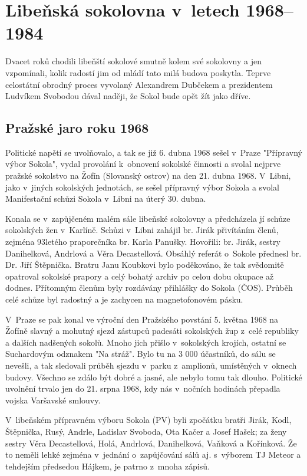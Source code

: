 \documentclass[a5paper, 11pt, twoside]{article}
\begin{document}
\section{Libeňská sokolovna v~letech
1968--1984}

Dvacet roků chodili libeňští sokolové smutně kolem své sokolovny a jen
vzpomínali, kolik radostí jim od mládí tato milá budova poskytla. Teprve
celostátní obrodný proces vyvolaný Alexandrem Dubčekem a prezidentem
Ludvíkem Svobodou dával naději, že Sokol bude opět žít jako dříve.

\subsection{Pražské jaro roku 1968}

Politické napětí se uvolňovalo, a tak se již 6. dubna 1968 sešel v~Praze
"Přípravný výbor Sokola", vydal provolání k~obnovení sokolské činnosti
a svolal nejprve pražské sokolstvo na Žofín (Slovanský ostrov) na den
21. dubna 1968. V~Libni, jako v~jiných sokolských jednotách, se sešel
přípravný výbor Sokola a svolal Manifestační schůzi Sokola v~Libni na
úterý 30. dubna.

Konala se v~zapůjčeném malém sále libeňské sokolovny a předcházela jí
schůze sokolských žen v~Karlíně. Schůzi v~Libni zahájil br. Jirák
přivítáním členů, zejména 93letého praporečníka br. Karla Panušky.
Hovořili: br. Jirák, sestry Danihelková, Andrlová a Věra Decastellová.
Obsáhlý referát o~Sokole přednesl br. Dr. Jiří Štěpnička. Bratru Janu
Koubkovi bylo poděkováno, že tak svědomitě opatroval sokolské prapory a
celý bohatý archiv po celou dobu okupace až dodnes. Přítomným členům
byly rozdávány přihlášky do Sokola (ČOS). Průběh celé schůze byl
radostný a je zachycen na magnetofonovém pásku.

V~Praze se pak konal ve výroční den Pražského povstání 5. května 1968 na
Žofíně slavný a mohutný sjezd zástupců padesáti sokolských žup z~celé
republiky a dalších nadšených sokolů. Mnoho jich přišlo v~sokolských
krojích, ostatní se Suchardovým odznakem "Na stráž". Bylo tu na 3 000
účastníků, do sálu se nevešli, a tak sledovali průběh sjezdu v~parku
z~amplionů, umístěných v~oknech budovy. Všechno se zdálo být dobré a
jasné, ale nebylo tomu tak dlouho. Politické uvolnění trvalo jen do 21.
srpna 1968, kdy nás v~nočních hodinách přepadla vojska Varšavské
smlouvy.

V~libeňském přípravném výboru Sokola (PV) byli zpočátku bratři Jirák,
Kodl, Štěpnička, Rusý, Andrle, Ladislav Svoboda, Ota Kačer a Josef
Hašek; za ženy sestry Věra Decastellová, Holá, Andrlová, Danihelková,
Vaňková a Kořínková. Že to neměli lehké zejména v~jednání o~zapůjčování
sálů aj. s~výborem TJ Meteor a tehdejším předsedou Hájkem, je patrno
z~mnoha zápisů.
\end{document}
